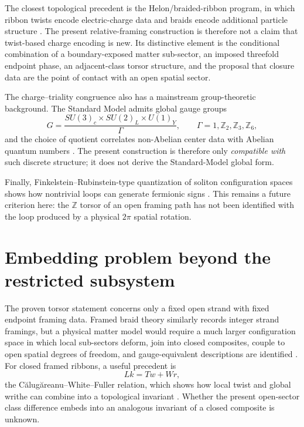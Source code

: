 \documentclass[aps,prd,reprint,superscriptaddress,nofootinbib,longbibliography,floatfix]{revtex4-2}
\begin{document}
The closest topological precedent is the Helon/braided-ribbon program, in which ribbon twists encode electric-charge data and braids encode additional particle structure \cite{BilsonThompson2005,BilsonThompson2007,Chester2025}. The present relative-framing construction is therefore not a claim that twist-based charge encoding is new. Its distinctive element is the conditional combination of a boundary-exposed matter sub-sector, an imposed threefold endpoint phase, an adjacent-class torsor structure, and the proposal that closure data are the point of contact with an open spatial sector.

The charge--triality congruence also has a mainstream group-theoretic background. The Standard Model admits global gauge groups
\begin{equation}
G=\frac{SU(3)_c\times SU(2)_L\times U(1)_Y}{\Gamma},
\qquad
\Gamma=1,\mathbb Z_2,\mathbb Z_3,\mathbb Z_6,
\end{equation}
and the choice of quotient correlates non-Abelian center data with Abelian quantum numbers \cite{Tong2017,HsinGomis2024}. The present construction is therefore only \emph{compatible with} such discrete structure; it does not derive the Standard-Model global form.

Finally, Finkelstein--Rubinstein-type quantization of soliton configuration spaces shows how nontrivial loops can generate fermionic signs \cite{KruschSpeight2006}. This remains a future criterion here: the $\mathbb Z$ torsor of an open framing path has not been identified with the loop produced by a physical $2\pi$ spatial rotation.

\section{Embedding problem beyond the restricted subsystem}
\label{sec:framed}

The proven torsor statement concerns only a fixed open strand with fixed endpoint framing data. Framed braid theory similarly records integer strand framings, but a physical matter model would require a much larger configuration space in which local sub-sectors deform, join into closed composites, couple to open spatial degrees of freedom, and gauge-equivalent descriptions are identified \cite{KoSmolinsky1992}. For closed framed ribbons, a useful precedent is
\begin{equation}
Lk=Tw+Wr,
\label{eq:CWF}
\end{equation}
the C\u{a}lug\u{a}reanu--White--Fuller relation, which shows how local twist and global writhe can combine into a topological invariant \cite{White1969,Fuller1971}. Whether the present open-sector class difference embeds into an analogous invariant of a closed composite is unknown.
\end{document}
